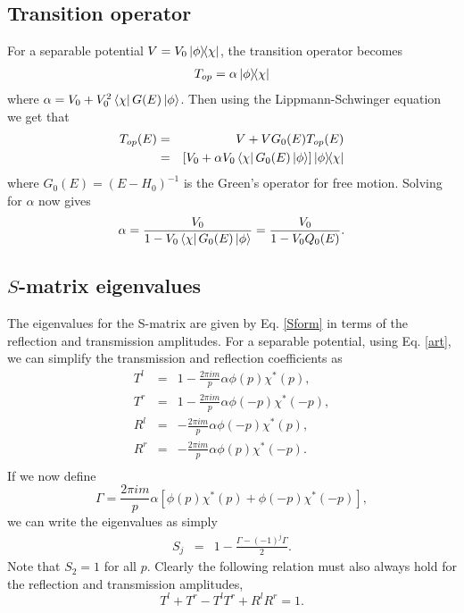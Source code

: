 \subsection{Transition operator}
\label{app1}
 For a separable potential $V=V_0 \ketbra{\phi}{\chi}$, the transition operator becomes
\begin{eqnarray}
T_{op}=\alpha \ketbra{\phi}{\chi}
\end{eqnarray}
where $\alpha=V_{0}+V_{0}^{2}\bra{\chi}G(E)\ket{\phi}$. Then using the Lippmann-Schwinger equation we get that
%
\begin{eqnarray}
T_{op}(E)&=&V+VG_{0}(E)T_{op}(E)
\nonumber \\
&=& \left[V_{0}+\alpha V_{0} \bra{\chi}G_{0}(E)\ket{\phi}\right]\ketbra{\phi}{\chi}
\end{eqnarray}
%
where $G_{0}(E)=(E-H_{0})^{-1}$ is the Green's operator for free motion. Solving for $\alpha$ now gives
%
\begin{eqnarray}
\alpha =\frac{V_{0}}{1-V_{0} \bra{\chi}G_{0}(E)\ket{\phi}}
		   =\frac{V_{0}}{1-V_{0} Q_{0}(E)}.
\end{eqnarray}
%
%
%
%
%
\subsection{$S$-matrix eigenvalues}
\label{app2}
%
%
%
%
The eigenvalues for the S-matrix are given by Eq. \eqref{Sform} in terms of the reflection and transmission amplitudes. For a separable potential, using Eq. \eqref{art}, we can simplify the transmission and reflection coefficients as
\begin{eqnarray}
T^{l}&=&1-\frac{2 \pi i m}{p} \alpha \phi(p) \chi^{*}(p),
\nonumber \\
T^{r}&=&1-\frac{2 \pi i m}{p} \alpha \phi(-p) \chi^{*}(-p),
\nonumber \\
R^{l}&=&-\frac{2 \pi i m}{p} \alpha \phi(-p) \chi^{*}(p),
\nonumber \\
R^{r}&=&-\frac{2 \pi i m}{p} \alpha \phi(p) \chi^{*}(-p).
\nonumber \\
\end{eqnarray}
%
If we now define
%
\begin{equation}
\Gamma=\frac{2 \pi i m}{p} \alpha \left[\phi(p) \chi^{*}(p)+\phi(-p) \chi^{*}(-p)\right],
\end{equation}
%
we can write the eigenvalues as simply
%
\begin{eqnarray}
S_{j}&=&1-\frac{\Gamma-(-1)^{j}\Gamma}{2}.
\end{eqnarray}
%
Note that $S_2=1$ for all $p$. Clearly the following relation must also always hold for the reflection and transmission amplitudes,
%
\begin{equation}
T^l + T^r - T^l T^r + R^l R^r = 1.
\end{equation}
%
%
%
%
%
%
%
%
